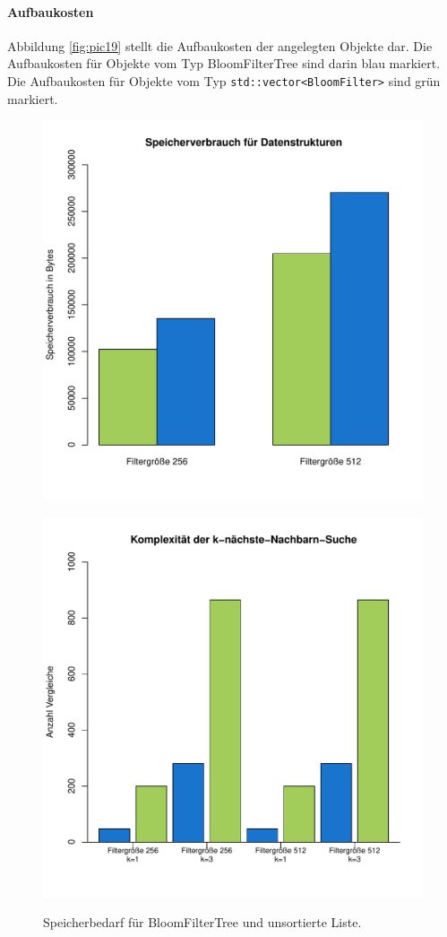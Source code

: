 \paragraph*{Aufbaukosten}
Abbildung \ref{fig:pic19} stellt die Aufbaukosten der angelegten Objekte dar. Die Aufbaukosten für Objekte vom Typ BloomFilterTree sind darin blau markiert. Die Aufbaukosten für Objekte vom Typ \texttt{std::vector<BloomFilter>} sind grün markiert. 
\begin{figure}[hptb]
	\centering
	\includegraphics[scale=0.7]{pictures/mem.pdf}\\
	\caption[Speicherbedarf für BloomFilterTree und unsortierte Liste]{Speicherbedarf für BloomFilterTree und unsortierte Liste.}\label{fig:pic17} 
	\includegraphics[scale=0.7]{pictures/compl.pdf}\\

\end{figure}
